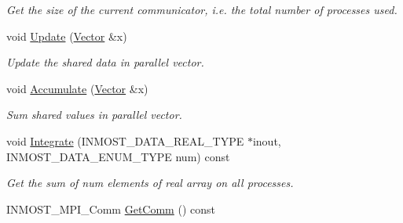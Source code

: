 \begin{DoxyCompactItemize}
\begin{DoxyCompactList}\small\item\em Get the size of the current communicator, i.\-e. the total number of processes used. \end{DoxyCompactList}\item 
\hypertarget{classINMOST_1_1Solver_1_1OrderInfo_a76c34bb3769aa0f8b29d0a9bb4f05d0c}{void \hyperlink{classINMOST_1_1Solver_1_1OrderInfo_a76c34bb3769aa0f8b29d0a9bb4f05d0c}{Update} (\hyperlink{classINMOST_1_1Solver_1_1Vector}{Vector} \&x)}\label{classINMOST_1_1Solver_1_1OrderInfo_a76c34bb3769aa0f8b29d0a9bb4f05d0c}

\begin{DoxyCompactList}\small\item\em Update the shared data in parallel vector. \end{DoxyCompactList}\item 
\hypertarget{classINMOST_1_1Solver_1_1OrderInfo_a4576eab65fafa6986f46161444e47850}{void \hyperlink{classINMOST_1_1Solver_1_1OrderInfo_a4576eab65fafa6986f46161444e47850}{Accumulate} (\hyperlink{classINMOST_1_1Solver_1_1Vector}{Vector} \&x)}\label{classINMOST_1_1Solver_1_1OrderInfo_a4576eab65fafa6986f46161444e47850}

\begin{DoxyCompactList}\small\item\em Sum shared values in parallel vector. \end{DoxyCompactList}\item 
\hypertarget{classINMOST_1_1Solver_1_1OrderInfo_af82028af97d514f9811d21a5b58ae9e9}{void \hyperlink{classINMOST_1_1Solver_1_1OrderInfo_af82028af97d514f9811d21a5b58ae9e9}{Integrate} (I\-N\-M\-O\-S\-T\-\_\-\-D\-A\-T\-A\-\_\-\-R\-E\-A\-L\-\_\-\-T\-Y\-P\-E $\ast$inout, I\-N\-M\-O\-S\-T\-\_\-\-D\-A\-T\-A\-\_\-\-E\-N\-U\-M\-\_\-\-T\-Y\-P\-E num) const }\label{classINMOST_1_1Solver_1_1OrderInfo_af82028af97d514f9811d21a5b58ae9e9}

\begin{DoxyCompactList}\small\item\em Get the sum of num elements of real array on all processes. \end{DoxyCompactList}\item 
\hypertarget{classINMOST_1_1Solver_1_1OrderInfo_a95d7134a518336c36025e18171eafb05}{I\-N\-M\-O\-S\-T\-\_\-\-M\-P\-I\-\_\-\-Comm \hyperlink{classINMOST_1_1Solver_1_1OrderInfo_a95d7134a518336c36025e18171eafb05}{Get\-Comm} () const }\label{classINMOST_1_1Solver_1_1OrderInfo_a95d7134a518336c36025e18171eafb05}


\end{DoxyCompactItemize}
